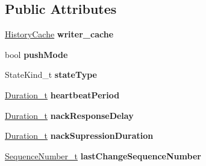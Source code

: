 \subsection*{\-Public \-Attributes}
\begin{DoxyCompactItemize}
\item 
\hypertarget{classeprosima_1_1rtps_1_1_r_t_p_s_writer_a938c7ad29bba14d5dfe74dd7597ee395}{\hyperlink{classeprosima_1_1rtps_1_1_history_cache}{\-History\-Cache} {\bfseries writer\-\_\-cache}}\label{classeprosima_1_1rtps_1_1_r_t_p_s_writer_a938c7ad29bba14d5dfe74dd7597ee395}

\item 
\hypertarget{classeprosima_1_1rtps_1_1_r_t_p_s_writer_a8b7d1fcee4d5760792ea8346889da096}{bool {\bfseries push\-Mode}}\label{classeprosima_1_1rtps_1_1_r_t_p_s_writer_a8b7d1fcee4d5760792ea8346889da096}

\item 
\hypertarget{classeprosima_1_1rtps_1_1_r_t_p_s_writer_a64c6140412b01e03f7963007d3212569}{\-State\-Kind\-\_\-t {\bfseries state\-Type}}\label{classeprosima_1_1rtps_1_1_r_t_p_s_writer_a64c6140412b01e03f7963007d3212569}

\item 
\hypertarget{classeprosima_1_1rtps_1_1_r_t_p_s_writer_af8be1aa5a8872a1b07d70700ca2505f1}{\hyperlink{structeprosima_1_1rtps_1_1_time__t}{\-Duration\-\_\-t} {\bfseries heartbeat\-Period}}\label{classeprosima_1_1rtps_1_1_r_t_p_s_writer_af8be1aa5a8872a1b07d70700ca2505f1}

\item 
\hypertarget{classeprosima_1_1rtps_1_1_r_t_p_s_writer_a294183104d776e13997eabaea2a8cc9b}{\hyperlink{structeprosima_1_1rtps_1_1_time__t}{\-Duration\-\_\-t} {\bfseries nack\-Response\-Delay}}\label{classeprosima_1_1rtps_1_1_r_t_p_s_writer_a294183104d776e13997eabaea2a8cc9b}

\item 
\hypertarget{classeprosima_1_1rtps_1_1_r_t_p_s_writer_ae4f2e1c7f01e144038ad6868f49fc8b5}{\hyperlink{structeprosima_1_1rtps_1_1_time__t}{\-Duration\-\_\-t} {\bfseries nack\-Supression\-Duration}}\label{classeprosima_1_1rtps_1_1_r_t_p_s_writer_ae4f2e1c7f01e144038ad6868f49fc8b5}

\item 
\hypertarget{classeprosima_1_1rtps_1_1_r_t_p_s_writer_a48aa70794ecc42d51e6072dde7620555}{\hyperlink{structeprosima_1_1rtps_1_1_sequence_number__t}{\-Sequence\-Number\-\_\-t} {\bfseries last\-Change\-Sequence\-Number}}\label{classeprosima_1_1rtps_1_1_r_t_p_s_writer_a48aa70794ecc42d51e6072dde7620555}


\end{DoxyCompactItemize}
